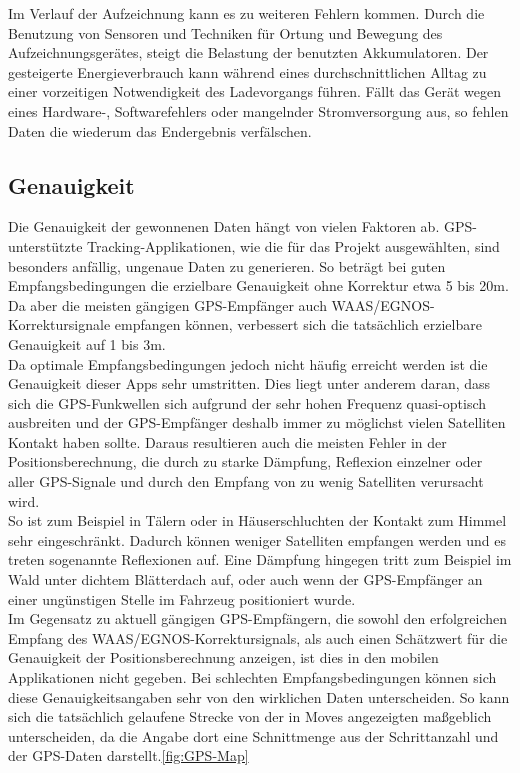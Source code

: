 Im Verlauf der Aufzeichnung kann es zu weiteren Fehlern kommen.
Durch die Benutzung von Sensoren und Techniken für Ortung und Bewegung des Aufzeichnungsgerätes, steigt die Belastung der benutzten Akkumulatoren.
Der gesteigerte Energieverbrauch kann während eines durchschnittlichen Alltag zu einer vorzeitigen Notwendigkeit des Ladevorgangs führen.
Fällt das Gerät wegen eines Hardware-, Softwarefehlers oder mangelnder Stromversorgung aus, so fehlen Daten die wiederum das Endergebnis verfälschen.

\subsection{Genauigkeit}
\label{ch:Relativierung:sec:SystematischeUndZufälligeFehler:subsec:Genauigkeit}

Die Genauigkeit der gewonnenen Daten hängt von vielen Faktoren ab. 
GPS-unterstützte Tracking-Applikationen, wie die für das Projekt ausgewählten, sind besonders  anfällig, ungenaue Daten zu generieren. 
So beträgt bei guten Empfangsbedingungen die erzielbare Genauigkeit ohne Korrektur etwa 5 bis 20m. 
Da aber die meisten gängigen GPS-Empfänger auch WAAS/EGNOS-Korrektursignale empfangen können, verbessert sich die tatsächlich erzielbare Genauigkeit auf 1 bis 3m. \\
Da optimale Empfangsbedingungen jedoch nicht häufig erreicht  werden ist die Genauigkeit dieser Apps sehr umstritten.
Dies liegt unter anderem daran, dass sich die GPS-Funkwellen sich aufgrund der sehr hohen Frequenz quasi-optisch ausbreiten und der GPS-Empfänger deshalb immer zu möglichst vielen Satelliten Kontakt haben sollte. 
Daraus resultieren auch die meisten Fehler in der Positionsberechnung, die durch zu starke Dämpfung, Reflexion einzelner oder aller GPS-Signale und durch den Empfang von zu wenig Satelliten verursacht wird. \\
So ist zum Beispiel in Tälern oder in Häuserschluchten der Kontakt zum Himmel sehr eingeschränkt. 
Dadurch können weniger Satelliten empfangen werden und es treten sogenannte Reflexionen auf. 
Eine Dämpfung hingegen tritt zum Beispiel im Wald unter dichtem Blätterdach auf, oder auch wenn der GPS-Empfänger an einer ungünstigen Stelle im Fahrzeug positioniert wurde. \\
Im Gegensatz zu aktuell gängigen GPS-Empfängern, die sowohl den erfolgreichen Empfang des WAAS/EGNOS-Korrektursignals, als auch einen Schätzwert für die Genauigkeit der Positionsberechnung anzeigen, ist dies in den mobilen Applikationen nicht gegeben. 
Bei schlechten Empfangsbedingungen können sich diese Genauigkeitsangaben sehr von den wirklichen Daten unterscheiden.  
So kann sich die tatsächlich gelaufene Strecke von der in Moves angezeigten maßgeblich unterscheiden, da die Angabe dort eine Schnittmenge aus der Schrittanzahl und der GPS-Daten darstellt.\ref{fig:GPS-Map}


